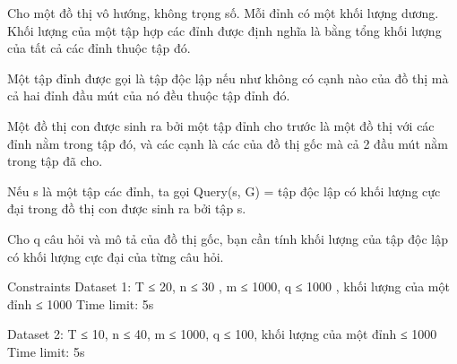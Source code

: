 Cho một đồ thị vô hướng, không trọng số. Mỗi đỉnh có một khối lượng dương. Khối lượng của một tập hợp các đỉnh được định nghĩa là bằng tổng khối lượng của tất cả các đỉnh thuộc tập đó.  

   Một tập đỉnh được gọi là tập độc lập nếu như không có cạnh nào của đồ thị mà cả hai đỉnh đầu mút của nó đều thuộc tập đỉnh đó.  

   Một đồ thị con được sinh ra bởi một tập đỉnh cho trước là một đồ thị với các đỉnh nằm trong tập đó, và các cạnh là các của đồ thị gốc mà cả 2 đầu mút nằm trong tập đã cho.  

   Nếu s là một tập các đỉnh, ta gọi Query(s, G) = tập độc lập có khối lượng cực đại trong đồ thị con được sinh ra bởi tập s.  

   Cho q câu hỏi và mô tả của đồ thị gốc, bạn cần tính khối lượng của tập độc lập có khối lượng cực đại của từng câu hỏi.  

Constraints
Dataset 1: T ≤ 20, n ≤ 30 , m ≤ 1000, q ≤ 1000 , khối lượng của một đỉnh ≤ 1000 Time limit: 5s  

   Dataset 2: T ≤ 10, n ≤ 40, m ≤ 1000, q ≤ 100, khối lượng của một đỉnh ≤ 1000 Time limit: 5s